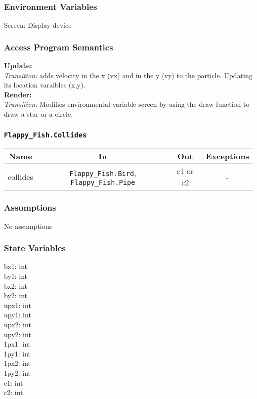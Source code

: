 \documentclass[11pt, oneside]{article}   	%
\begin{document}
\subsubsection*{Environment Variables}
Screen: Display device\\



\subsubsection*{Access Program Semantics} 
 \textbf{Update:}  \\
 \textit{Transition:} adds velocity in the x (vx) and in the y (vy) to the particle. Updating its location varaibles (x,y).\\
 \textbf{Render:}  \\
 \textit{Transition:} Modifies environmental variable screen by using the draw function to draw a star or a circle.\\

\subsubsection*{\texttt{Flappy\_Fish.Collides}}



\begin{center}
\begin{tabular}{ |c|c|c|c| } 
 \hline
 Name & In & Out & Exceptions \\ 
 \hline \hline
 collides & \texttt{Flappy\_Fish.Bird}, \texttt{Flappy\_Fish.Pipe} & c1 or c2 & - \\ 

 \hline
\end{tabular}
\end{center}

\subsubsection*{Assumptions}
No assumptions

\subsubsection*{State Variables}
bx1: int\\
by1: int \\
bx2: int \\
by2: int \\
upx1: int\\
upy1: int \\
upx2: int \\
upy2: int \\
1px1: int \\
1py1: int \\
1px2: int \\
1py2: int \\
c1: int \\
c2: int \\
\end{document}
